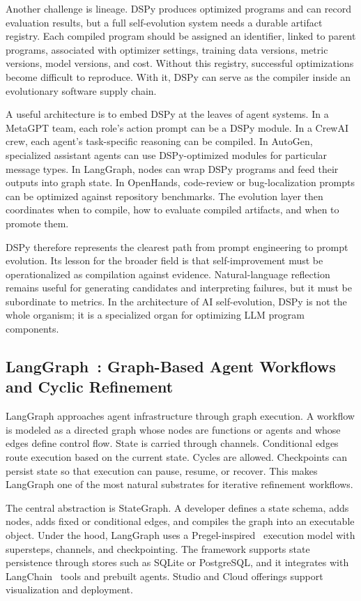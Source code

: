 Another challenge is lineage.  DSPy produces optimized programs and can record evaluation results, but a full self-evolution system needs a durable artifact registry.  Each compiled program should be assigned an identifier, linked to parent programs, associated with optimizer settings, training data versions, metric versions, model versions, and cost.  Without this registry, successful optimizations become difficult to reproduce.  With it, DSPy can serve as the compiler inside an evolutionary software supply chain.

A useful architecture is to embed DSPy at the leaves of agent systems.  In a MetaGPT team, each role's action prompt can be a DSPy module.  In a CrewAI crew, each agent's task-specific reasoning can be compiled.  In AutoGen, specialized assistant agents can use DSPy-optimized modules for particular message types.  In LangGraph, nodes can wrap DSPy programs and feed their outputs into graph state.  In OpenHands, code-review or bug-localization prompts can be optimized against repository benchmarks.  The evolution layer then coordinates when to compile, how to evaluate compiled artifacts, and when to promote them.

DSPy therefore represents the clearest path from prompt engineering to prompt evolution.  Its lesson for the broader field is that self-improvement must be operationalized as compilation against evidence.  Natural-language reflection remains useful for generating candidates and interpreting failures, but it must be subordinate to metrics.  In the architecture of AI self-evolution, DSPy is not the whole organism; it is a specialized organ for optimizing LLM program components.

\subsection{LangGraph~\cite{langgraph2024}: Graph-Based Agent Workflows and Cyclic Refinement}
\label{subsec:langgraph}

LangGraph approaches agent infrastructure through graph execution.  A workflow is modeled as a directed graph whose nodes are functions or agents and whose edges define control flow.  State is carried through channels.  Conditional edges route execution based on the current state.  Cycles are allowed.  Checkpoints can persist state so that execution can pause, resume, or recover.  This makes LangGraph one of the most natural substrates for iterative refinement workflows.

The central abstraction is StateGraph.  A developer defines a state schema, adds nodes, adds fixed or conditional edges, and compiles the graph into an executable object.  Under the hood, LangGraph uses a Pregel-inspired~\cite{malewicz2010pregel} execution model with supersteps, channels, and checkpointing.  The framework supports state persistence through stores such as SQLite or PostgreSQL, and it integrates with LangChain~\cite{chase2023langchain} tools and prebuilt agents.  Studio and Cloud offerings support visualization and deployment.

